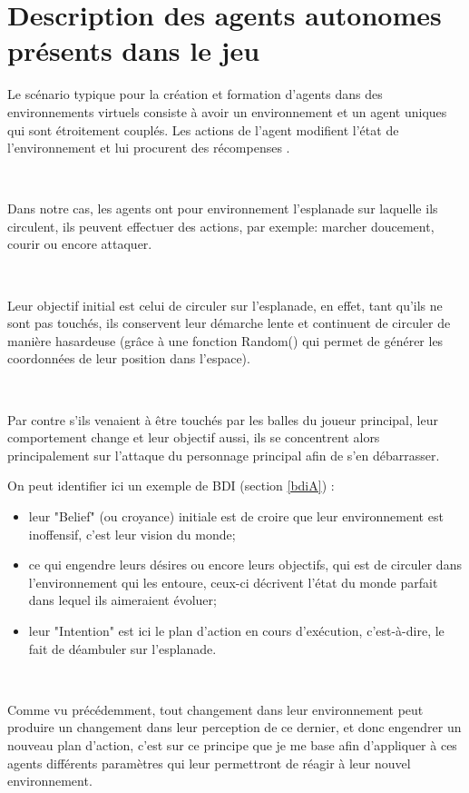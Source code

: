 \section{Description des agents autonomes présents dans le jeu}

Le scénario typique pour la création et formation d’agents dans des environnements virtuels consiste à avoir un environnement et un agent uniques qui sont étroitement couplés. Les actions de l'agent modifient l'état de l'environnement et lui procurent des récompenses \parencite{unity2}.  

~\par
Dans notre cas, les agents ont pour environnement l’esplanade sur laquelle ils circulent, ils peuvent effectuer des actions, par exemple:  marcher doucement, courir ou encore attaquer.
 
 
~\par 
Leur objectif initial est celui de circuler sur l'esplanade, en effet, tant qu’ils ne sont pas touchés, ils conservent leur démarche lente et continuent de circuler de manière hasardeuse (grâce à une fonction Random() qui permet de générer les coordonnées de leur position dans l’espace).

~\par
Par contre s'ils venaient à être touchés par les balles du joueur principal, leur comportement change et leur objectif aussi, ils se concentrent alors principalement sur l’attaque du personnage principal afin de s’en débarrasser.

On peut identifier ici un exemple de BDI (section \ref{bdiA}) : 

\begin{itemize}
\item leur "Belief" (ou croyance) initiale est de croire que leur environnement est inoffensif, c’est leur vision du monde;
\item ce qui engendre leurs désires ou encore leurs objectifs, qui est de circuler dans l’environnement qui les entoure, ceux-ci décrivent l'état du monde parfait dans lequel ils aimeraient évoluer;
\item leur "Intention" est ici le plan d’action en cours d'exécution, c’est-à-dire, le fait de déambuler sur l’esplanade.
\end{itemize}


~\par
Comme vu précédemment, tout changement dans leur environnement peut produire un changement dans leur perception de ce dernier, et donc engendrer un nouveau plan d’action, c’est sur ce principe que je me base afin d’appliquer à ces agents différents paramètres qui leur permettront de réagir à leur nouvel environnement. 

